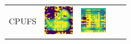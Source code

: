 \begin{table}[!ht]
\begin{tabular}{>{\centering\arraybackslash}p{0.95in}>{\centering\arraybackslash}p{1.0in}>{\centering\arraybackslash}p{1.0in}>{\centering\arraybackslash}p{1.0in}>{\centering\arraybackslash}p{1.0in}}
        CPUFS & \parbox[c]{1.0in}{
        \includegraphics[width=1\linewidth]{figures/CPUFS/visualization/feaCPUFS_COIL20.pdf}} & \parbox[c]{1.0in}{
        \includegraphics[width=1\linewidth]{figures/CPUFS/visualization/feaCPUFS_breastmnist.pdf}} & \parbox[c]{1.0in}{
}
\end{tabular}
\end{table}
